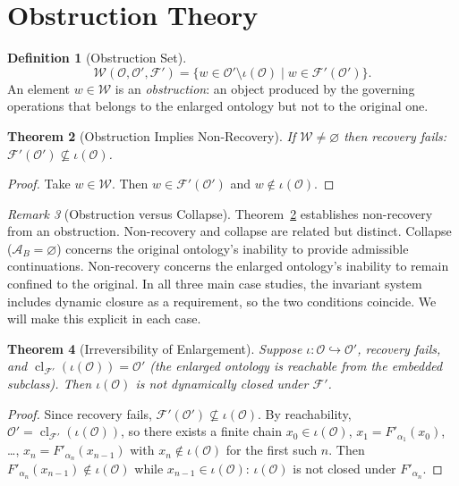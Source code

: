 \documentclass[12pt,oneside]{book}
\theoremstyle{plain}
\newtheorem{theorem}{Theorem}[chapter]
\theoremstyle{definition}
\newtheorem{definition}[theorem]{Definition}
\theoremstyle{remark}
\newtheorem{remark}[theorem]{Remark}
\newcommand{\Oold}{\mathcal{O}}
\newcommand{\Onew}{\mathcal{O}'}
\newcommand{\F}{\mathcal{F}}
\newcommand{\Admiss}{\mathcal{A}}
\newcommand{\W}{\mathcal{W}}
\newcommand{\cl}{\operatorname{cl}}
\begin{document}
\section{Obstruction Theory}

\begin{definition}[Obstruction Set]
\[
  \W(\Oold, \Onew, \F') =
  \{ w \in \Onew \setminus \iota(\Oold) \mid w \in \F'(\Onew) \}.
\]
An element $w \in \W$ is an \emph{obstruction}: an object produced by the
governing operations that belongs to the enlarged ontology but not to the
original one.
\end{definition}

\begin{theorem}[Obstruction Implies Non-Recovery]
\label{thm:obstruction-nonrecovery}
If $\W \neq \varnothing$ then recovery fails: $\F'(\Onew) \not\subseteq
\iota(\Oold)$.
\end{theorem}

\begin{proof}
Take $w \in \W$. Then $w \in \F'(\Onew)$ and $w \notin \iota(\Oold)$.
\end{proof}

\begin{remark}[Obstruction versus Collapse]
Theorem~\ref{thm:obstruction-nonrecovery} establishes non-recovery from an
obstruction. Non-recovery and collapse are related but distinct. Collapse
($\Admiss_B = \varnothing$) concerns the original ontology's inability to
provide admissible continuations. Non-recovery concerns the enlarged ontology's
inability to remain confined to the original. In all three main case studies,
the invariant system includes dynamic closure as a requirement, so the two
conditions coincide. We will make this explicit in each case.
\end{remark}

\begin{theorem}[Irreversibility of Enlargement]
\label{thm:irreversibility}
Suppose $\iota : \Oold \hookrightarrow \Onew$, recovery fails, and
$\cl_{\F'}(\iota(\Oold)) = \Onew$ (the enlarged ontology is reachable from
the embedded subclass). Then $\iota(\Oold)$ is not dynamically closed under
$\F'$.
\end{theorem}

\begin{proof}
Since recovery fails, $\F'(\Onew) \not\subseteq \iota(\Oold)$. By
reachability, $\Onew = \cl_{\F'}(\iota(\Oold))$, so there exists a finite
chain $x_0 \in \iota(\Oold)$, $x_1 = F'_{\alpha_1}(x_0)$, \ldots,
$x_n = F'_{\alpha_n}(x_{n-1})$ with $x_n \notin \iota(\Oold)$ for the
first such $n$. Then $F'_{\alpha_n}(x_{n-1}) \notin \iota(\Oold)$ while
$x_{n-1} \in \iota(\Oold)$: $\iota(\Oold)$ is not closed under
$F'_{\alpha_n}$.
\end{proof}
\end{document}
